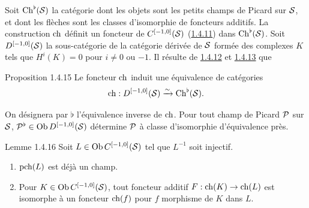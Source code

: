 \documentclass[10pt]{../fichiers-configuration-latex/smfart}
\begin{document}
\subsubsection{}
Soit $\operatorname{Ch}^{\flat}({\mathcal S})$ la catégorie dont les objets
sont les petits champs de Picard sur ${\mathcal S}$, et dont les
flèches sont les classes d'isomorphie de foncteurs\pageoriginale
additifs. La construction $\operatorname{ch}$ définit un foncteur de
$C^{[-1,0]}({\mathcal S})$ (\hyperref[XVIII.subsubsec1.4.11]{1.4.11}) dans
$\operatorname{Ch}^{\flat}({\mathcal S})$. Soit $D^{[-1,0]}({\mathcal S})$ la
sous-catégorie de la catégorie dérivée de ${\mathcal S}$ formée des
complexes $K$ tels que $H^{i}(K)=0$ pour $i\neq 0$ ou $-1$. Il résulte
de \hyperref[XVIII.subsubsec1.4.12]{1.4.12} et \hyperref[XVIII.lem1.4.13]{1.4.13} que

\begin{enonce*}{Proposition 1.4.15}
Le foncteur $\operatorname{ch}$ induit une équivalence de catégories
$$
\operatorname{ch}:D^{[-1,0]}({\mathcal S})\xrightarrow{\sim}
\operatorname{Ch}^{\flat}({\mathcal S}){}.
$$
\end{enonce*}

On désignera par $\flat$ l'équivalence inverse de $\operatorname{ch}$. Pour tout
champ de Picard ${\mathcal P}$ sur ${\mathcal S}$,
${\mathcal P}^{\flat}\in \operatorname{Ob} D^{[-1,0]}({\mathcal S})$ détermine
${\mathcal P}$ à classe d'isomorphie d'équivalence près.

\begin{enonce*}{Lemme 1.4.16}
Soit $L\in \operatorname{Ob} C^{[-1,0]}({\mathcal S})$ tel que $L^{-1}$ soit
injectif.
\begin{enumerate}
\renewcommand{\theenumi}{\Roman{enumi}}
\renewcommand{\labelenumi}{(\theenumi)}
\item $\operatorname{pch}(L)$ est déjà un champ.

\item Pour $K\in \operatorname{Ob} C^{[-1,0]}({\mathcal S})$, tout foncteur additif
$F:\operatorname{ch}(K)\rightarrow \operatorname{ch}(L)$ est isomorphe à un foncteur $\operatorname{ch}(f)$ pour
$f$ morphisme de $K$ dans $L$.
\end{enumerate}
\end{enonce*}
\end{document}
